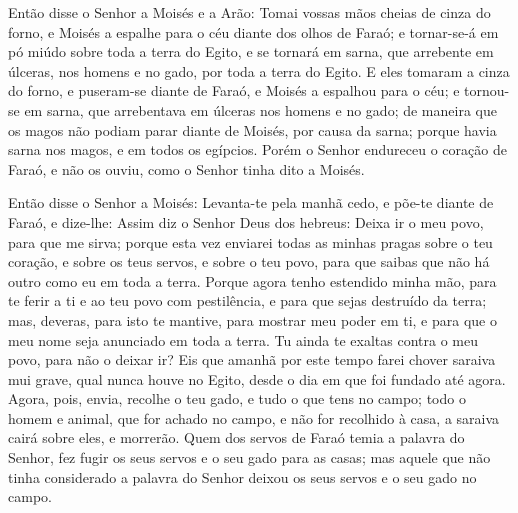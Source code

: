 Então disse o Senhor a Moisés e a Arão: Tomai vossas mãos cheias
de cinza do forno, e Moisés a espalhe para o céu diante dos olhos de
Faraó; e tornar-se-á em pó miúdo sobre toda a terra do Egito, e
se tornará em sarna, que arrebente em úlceras, nos homens e no gado,
por toda a terra do Egito. E eles tomaram a cinza do forno, e
puseram-se diante de Faraó, e Moisés a espalhou para o céu; e
tornou-se em sarna, que arrebentava em úlceras nos homens e no gado;
de maneira que os magos não podiam parar diante de Moisés,
por causa da sarna; porque havia sarna nos magos, e em todos os
egípcios. Porém o Senhor endureceu o coração de Faraó, e não
os ouviu, como o Senhor tinha dito a Moisés.

Então disse o Senhor a Moisés: Levanta-te pela manhã cedo, e
põe-te diante de Faraó, e dize-lhe: Assim diz o Senhor Deus dos
hebreus: Deixa ir o meu povo, para que me sirva; porque esta
vez enviarei todas as minhas pragas sobre o teu coração, e sobre os
teus servos, e sobre o teu povo, para que saibas que não há outro
como eu em toda a terra. Porque agora tenho estendido minha
mão, para te ferir a ti e ao teu povo com pestilência, e para que
sejas destruído da terra; mas, deveras, para isto te mantive,
para mostrar meu poder em ti, e para que o meu nome seja anunciado
em toda a terra. Tu ainda te exaltas contra o meu povo, para
não o deixar ir? Eis que amanhã por este tempo farei chover
saraiva mui grave, qual nunca houve no Egito, desde o dia em que foi
fundado até agora. Agora, pois, envia, recolhe o teu gado, e
tudo o que tens no campo; todo o homem e animal, que for achado no
campo, e não for recolhido à casa, a saraiva cairá sobre eles, e
morrerão. Quem dos servos de Faraó temia a palavra do Senhor,
fez fugir os seus servos e o seu gado para as casas; mas
aquele que não tinha considerado a palavra do Senhor deixou os seus
servos e o seu gado no campo.

